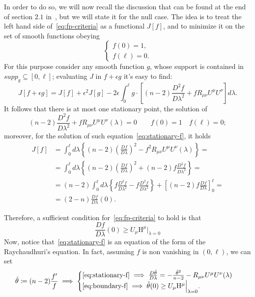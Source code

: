 	In order to do so, we will now recall the discussion that can be found at the end of section \(2.1\) in~\cite{fewster2020new}, but we will state it for the null case.
	The idea is to treat the left hand side of~\ref{eq:fp-criteria} as a functional \(J[f]\), and to minimize it on the set of smooth functions obeying 
	\[
	\begin{cases}
	f(0) = 1, \\
	f(\ell) = 0.
	\end{cases}
	\]
	For this purpose consider any smooth function \(g\), whose support is contained in \(supp_g \subseteq [0, \ell]\); evaluating \(J\) in \(f + \epsilon g\) it's easy to find:
	\[
	J[f + \epsilon g] = J[f] + \epsilon^2J[g] - 2\epsilon\int_{0}^{\ell} g \cdot \left[(n - 2) \frac{D^2f}{D\lambda^2} + fR_{\mu\nu}U^{\mu}U^{\nu}\right] d\lambda.
	\]
	It follows that there is at most one stationary point, the solution of
	\begin{equation}
	\label{eq:stationary-f}
		(n - 2) \frac{D^2f}{D\lambda^2} + fR_{\mu\nu}U^{\mu}U^{\nu}(\lambda) = 0 \quad \quad f(0) = 1 \quad f(\ell) = 0;
	\end{equation}
	moreover, for the solution of such equation~\eqref{eq:stationary-f}, it holds
	\begin{align*}
	J[f] &= \int_{0}^{\ell} d\lambda \left\lbrace (n - 2) \left(\frac{Df}{D\lambda}\right)^2 -f^2R_{\mu\nu}U^{\mu}U^{\nu}(\lambda) \right\rbrace= \\
%	
	&= \int_{0}^{\ell} d\lambda \left\lbrace (n - 2) \left(\frac{Df}{D\lambda}\right)^2 +(n - 2)f\frac{D^2f}{D\lambda^2}  \right\rbrace =\\
%	
	&= (n - 2) \int_{0}^{\ell} d\lambda \left\lbrace f\frac{D^2f}{D\lambda^2} - f\frac{D^2f}{D\lambda^2} \right\rbrace + \left[(n - 2) f\frac{Df}{D\lambda} \right]_0^{\ell} =\\
%	
	&= (2 - n)\frac{Df}{D\lambda}(0).	
	\end{align*}
	
	Therefore, a sufficient condition for~\eqref{eq:fp-criteria} to hold is that
	\begin{equation}
		\label{eq:boundary-f}
		\frac{Df}{D\lambda}(0) \ge U_{\mu}\mathrm{H}^{\mu}\Big\vert_{\lambda = 0}
	\end{equation}
	Now, notice that~\eqref{eq:stationary-f} is an equation of the form of the Raychaudhuri's equation. In fact, assuming \(f\) is non vanishing in \((0, \ell)\), we can set 
	\[
	\tilde{\theta}\coloneqq (n - 2) \frac{f'}{f} \implies
	\begin{cases}
	\eqref{eq:stationary-f} \implies \frac{D\tilde{\theta}}{D\lambda} = -\frac{\tilde{\theta}^2}{n - 2} - R_{\mu\nu}U^{\mu}U^{\nu}(\lambda) \\
	\eqref{eq:boundary-f} \implies \tilde{\theta}(0) \ge U_{\mu}\mathrm{H}^{\mu}\Big\vert_{\lambda = 0}.
	\end{cases}	
	\]
	
